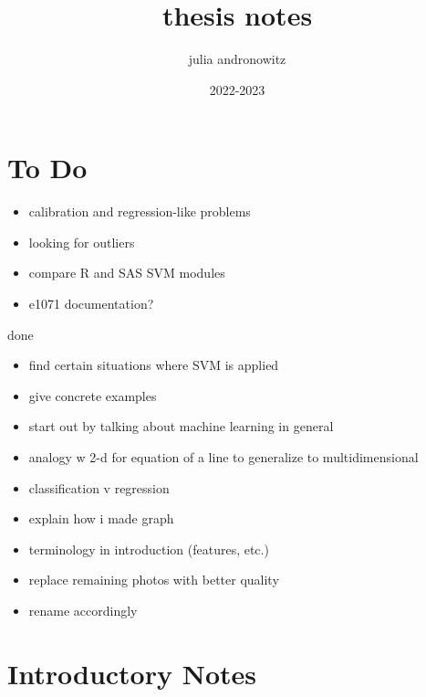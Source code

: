 \documentclass{article}
\title{thesis notes}
\author{julia andronowitz }
\date{2022-2023}
\begin{document}
\maketitle

\section{To Do}

\begin{itemize}
    \item calibration and regression-like problems
    \item looking for outliers
    \item compare R and SAS SVM modules
    \item e1071 documentation?
\end{itemize}

done
\begin{itemize}
    \item find certain situations where SVM is applied
    \item give concrete examples
    \item start out by talking about machine learning in general
    \item analogy w 2-d for equation of a line to generalize to multidimensional
    \item classification v regression
    \item explain how i made graph
    \item terminology in introduction (features, etc.)
    \item replace remaining photos with better quality
    \item rename accordingly
\end{itemize}

\section{Introductory Notes}
\end{document}
